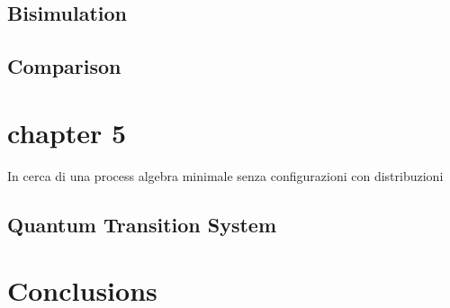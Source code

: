 \documentclass[10pt,a4paper, titlepage]{report}
\begin{document}
\section{Bisimulation}


\section{Comparison}




\chapter{chapter 5}
In cerca di una process algebra minimale
senza configurazioni	
con distribuzioni

\section{Quantum Transition System}


\chapter{Conclusions}
\printbibliography[
heading=bibintoc,
title={Bibliography}
]
\end{document}
